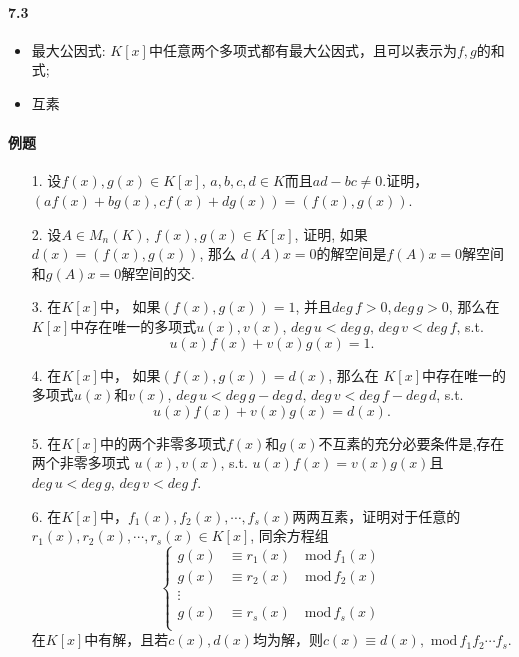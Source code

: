 \vspace{0.5cm}
\paragraph{7.3}
\begin{itemize}
  \item 最大公因式: $K[x]$中任意两个多项式都有最大公因式，且可以表示为$f,g$的和式;
  \item 互素
\end{itemize}
\paragraph{例题}
\begin{itemize}
  \item[1.] 设$f(x),g(x) \in K[x]$, $a,b,c,d\in K$而且$ad-bc\ne 0$.证明，
  $(af(x)+bg(x), cf(x)+dg(x)) = (f(x),g(x))$.
  \item[2.] 设$A\in M_n(K)$, $f(x),g(x)\in K[x]$, 证明, 如果$d(x) = (f(x), g(x))$, 那么
  $d(A)x=0$的解空间是$f(A)x=0$解空间和$g(A)x=0$解空间的交.
  \item[3.] 在$K[x]$中， 如果$(f(x),g(x))=1$, 并且$deg\,f >0, deg\,g>0$, 那么在
  $K[x]$中存在唯一的多项式$u(x), v(x)$, $deg\, u< deg\, g, \,deg\, v<deg\, f$,
  s.t.
  $$u(x)f(x) +v(x)g(x) = 1.$$
  \item[4.] 在$K[x]$中， 如果$(f(x),g(x))=d(x)$, 那么在
  $K[x]$中存在唯一的多项式$u(x)$和$v(x)$, $deg\,u < deg\,g - deg\,d,\,
  deg\,v<deg\,f - deg\,d$,
  s.t.
  $$u(x)f(x) +v(x)g(x) = d(x).$$
  \item[5.] 在$K[x]$中的两个非零多项式$f(x)$和$g(x)$不互素的充分必要条件是,存在两个非零多项式
  $u(x),v(x)$, s.t. $u(x)f(x) = v(x)g(x)$且$deg\,u <deg\,g$, $deg\,v<deg\,f$.
  \item[6.] 在$K[x]$中，$f_1(x),f_2(x),\cdots,f_s(x)$两两互素，证明对于任意的
  $r_1(x),r_2(x),\cdots, r_s(x)\in K[x]$, 同余方程组
  \begin{equation}
  \nonumber
  \left\{
    \begin{aligned}
    g(x) &\equiv r_1(x) \quad \mathrm{mod}\, f_1(x)\\
    g(x) &\equiv r_2(x) \quad \mathrm{mod}\, f_2(x)\\
    \vdots&\\
    g(x) &\equiv r_s(x) \quad \mathrm{mod}\, f_s(x)\\
    \end{aligned}
  \right.
  \end{equation}
  在$K[x]$中有解，且若$c(x),d(x)$均为解，则$c(x) \equiv d(x),\,\,\mathrm{mod}\,f_1 f_2\cdots f_s$.
\end{itemize}

